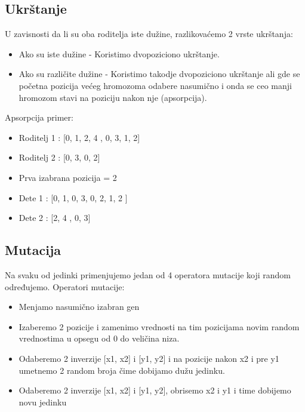 \documentclass{article}
\begin{document}
\subsection{Ukrštanje}
U zavisnosti da li su oba roditelja iste dužine, razlikovaćemo 2 vrste ukrštanja:
\begin{itemize}
\item 
Ako su iste dužine - Koristimo dvopoziciono ukrštanje.
\item 
Ako su različite dužine - Koristimo takodje dvopoziciono ukrštanje ali gde se početna pozicija većeg hromozoma
odabere nasumično i onda se ceo manji hromozom stavi na poziciju nakon nje (apsorpcija).
\end{itemize}
\newline
\newline
Apsorpcija primer:
\begin{itemize}
    \item 
    Roditelj 1 : [0, 1, 2, 4 , 0, 3, 1, 2]
    \item 
    Roditelj 2 : [0, 3, 0, 2]
    \item 
    Prva izabrana pozicija = 2
    \item 
    Dete 1 : [0, 1, 0, 3, 0, 2, 1, 2 ]
    \item 
    Dete 2 : [2, 4 , 0, 3]

\end{itemize}

\newpage

\subsection{Mutacija}

Na svaku od jedinki primenjujemo jedan od 4 operatora mutacije koji random određujemo.
\newline
\newline
Operatori mutacije:
\begin{itemize}
\item
 Menjamo nasumično izabran gen 
\item
 Izaberemo 2 pozicije  i zamenimo vrednosti na tim pozicijama novim random vrednostima u opsegu od 0 do veličina niza.

\item
 Odaberemo 2 inverzije [x1, x2] i [y1, y2] i na pozicije nakon x2 i pre y1 umetnemo 2 random broja čime
dobijamo dužu jedinku.
\item
Odaberemo 2 inverzije [x1, x2] i [y1, y2], obrisemo x2 i y1 i time dobijemo novu jedinku

\end{itemize}
\end{document}
